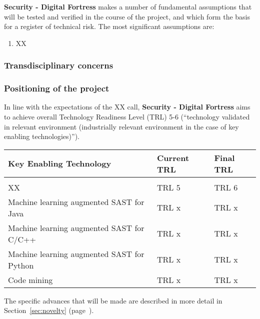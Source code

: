 \documentclass[a4paper,11pt]{article}
\newcommand{\project}[1]{\textbf{#1}\xspace}
\newcommand{\SECURITY}{\project{Security - Digital Fortress}}
\newcommand{\TheProject}{\SECURITY}
\begin{document}

\TheProject{} makes a number of fundamental assumptions that will be tested and verified in the course of the project,
and which form the basis for a register of technical risk.  The most significant assumptions are:

\begin{enumerate}[{A}1)]
\item XX
\end{enumerate}

\subsubsection*{Transdisciplinary concerns}


\subsubsection{Positioning of the project}

In line with the expectations of the XX call, \TheProject{} aims
to achieve overall Technology Readiness Level (TRL) 5-6 (``technology
validated in relevant environment (industrially relevant environment in
the case of key enabling technologies)'').

\begin{center}
  \begin{tabular}{|p{4.9in}|l|l|}
    \hline
    \textbf{Key Enabling Technology} & \textbf{Current TRL} & \textbf{Final TRL} \\
    \hline
     &  & \\
    \hline XX & TRL 5 & TRL 6 \\  
    \hline Machine learning augmented SAST for Java & TRL x & TRL x \\  
    \hline Machine learning augmented SAST for C/C++ & TRL x & TRL x \\  
    \hline Machine learning augmented SAST for Python & TRL x & TRL x \\  
    \hline Code mining & TRL x & TRL x \\  
    \hline
  \end{tabular}
\end{center}

\noindent
The specific advances that will be made are described in more detail in Section~\ref{sec:novelty} (page~\pageref{sec:novelty}).
\end{document}
